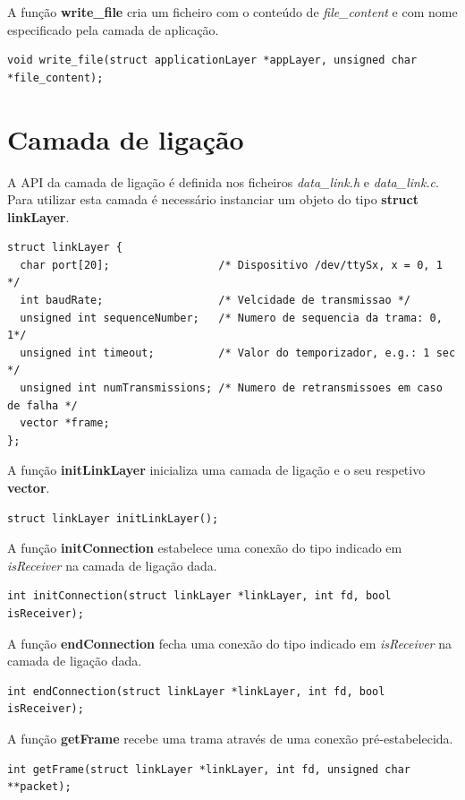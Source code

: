 \documentclass[11pt]{report}
\begin{document}
A função \textbf{write\_file} cria um ficheiro com o conteúdo de \textit{file\_content}
e com nome especificado pela camada de aplicação.
\begin{lstlisting}
void write_file(struct applicationLayer *appLayer, unsigned char *file_content);
\end{lstlisting}

\section{Camada de ligação}

A API da camada de ligação é definida nos ficheiros \textit{data\_link.h} e
\textit{data\_link.c}. Para utilizar esta camada é necessário instanciar um objeto
do tipo \textbf{struct linkLayer}.

\begin{lstlisting}
struct linkLayer {
  char port[20];                 /* Dispositivo /dev/ttySx, x = 0, 1 */
  int baudRate;                  /* Velcidade de transmissao */
  unsigned int sequenceNumber;   /* Numero de sequencia da trama: 0, 1*/
  unsigned int timeout;          /* Valor do temporizador, e.g.: 1 sec */
  unsigned int numTransmissions; /* Numero de retransmissoes em caso de falha */
  vector *frame;
};
\end{lstlisting}

A função \textbf{initLinkLayer} inicializa uma camada de ligação e o seu respetivo \textbf{vector}.
\begin{lstlisting}
struct linkLayer initLinkLayer();
\end{lstlisting}

A função \textbf{initConnection} estabelece uma conexão do tipo indicado em \textit{isReceiver}
na camada de ligação dada.
\begin{lstlisting}
int initConnection(struct linkLayer *linkLayer, int fd, bool isReceiver);
\end{lstlisting}

A função \textbf{endConnection} fecha uma conexão do tipo indicado em \textit{isReceiver}
na camada de ligação dada.
\begin{lstlisting}
int endConnection(struct linkLayer *linkLayer, int fd, bool isReceiver);
\end{lstlisting}

A função \textbf{getFrame} recebe uma trama através de uma conexão pré-estabelecida.
\begin{lstlisting}
int getFrame(struct linkLayer *linkLayer, int fd, unsigned char **packet);
\end{lstlisting}
\end{document}
